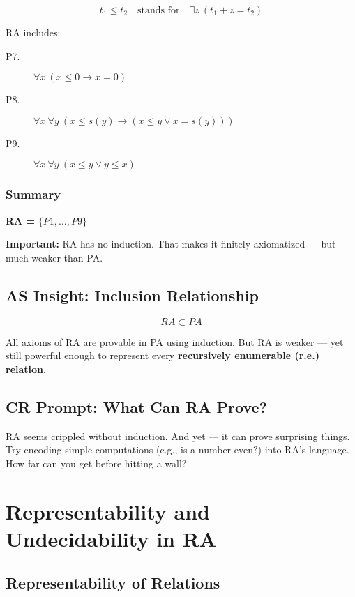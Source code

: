 \documentclass[12pt]{article}
\begin{document}
\[
t_1 \leq t_2 \quad \text{stands for} \quad \exists z\ (t_1 + z = t_2)
\]

RA includes:

\begin{description}
  \item[P7.] \( \forall x\ (x \leq 0 \rightarrow x = 0) \)
  \item[P8.] \( \forall x\ \forall y\ (x \leq s(y) \rightarrow (x \leq y \vee x = s(y))) \)
  \item[P9.] \( \forall x\ \forall y\ (x \leq y \vee y \leq x) \)
\end{description}

\subsubsection*{Summary}

\textbf{RA = } \( \{P1, \dots, P9\} \)

\vspace{0.5em}
\textbf{Important:} RA has no induction. That makes it finitely axiomatized — but much weaker than PA.

\subsection*{AS Insight: Inclusion Relationship}

\[
RA \subset PA
\]

All axioms of RA are provable in PA using induction. But RA is weaker — yet still powerful enough to represent every \textbf{recursively enumerable (r.e.) relation}.

\subsection*{CR Prompt: What Can RA Prove?}

RA seems crippled without induction. And yet — it can prove surprising things. Try encoding simple computations (e.g., is a number even?) into RA’s language. How far can you get before hitting a wall?

\section{Representability and Undecidability in RA}

\subsection{Representability of Relations}
\end{document}
